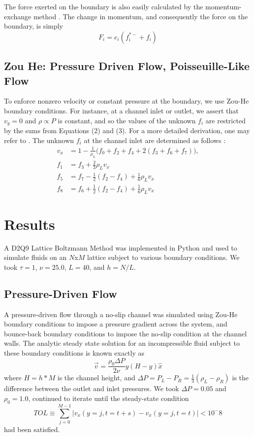 \documentclass[a4paper]{article}
\begin{document}
The force exerted on the boundary is also easily calculated by the momentum-exchange method \cite{momentumexchange} \cite{forcedcurved}. The change in momentum, and consequently the force on the boundary, is simply
\begin{equation}
    F_i = e_i(f_i^{*-} + f_i) 
\end{equation}

\subsection{Zou He: Pressure Driven Flow, Poisseuille-Like Flow}
To enforce nonzero velocity or constant pressure at the boundary, we use Zou-He boundary conditions. For instance, at a channel inlet or outlet, we assert that $v_y = 0$ and $\rho \propto P$ is constant, and so the values of the unknown $f_i$ are restricted by the sums from Equations (2) and (3). For a more detailed derivation, one may refer to \cite{ZouHe}. \cite{ZouHe} The unknown $f_i$ at the channel inlet are determined as follows \cite{ZouHe}:
\begin{align}
    v_x &= 1 - \frac{1}{\rho_L}\big(f_0 + f_2 + f_4 + 2(f_3 + f_6 + f_7)\big), \nonumber \\
    f_1 &= f_3 + \frac{2}{3}\rho_Lv_x \nonumber\\
    f_5 &= f_7 - \frac{1}{2}(f_2 - f_4) + \frac{1}{6}\rho_Lv_x \nonumber\\
    f_8 &= f_6 + \frac{1}{2}(f_2 - f_4) + \frac{1}{6}\rho_Lv_x
\end{align}

\section{Results}
A D2Q9 Lattice Boltzmann Method was implemented in Python and used to simulate fluids on an $N$x$M$ lattice subject to various boundary conditions. We took $\tau=1$, $\nu = 25.0$, $L=40$, and $h=N/L$.

\subsection{Pressure-Driven Flow}
A pressure-driven flow through a no-slip channel was simulated using Zou-He boundary conditions to impose a pressure gradient across the system, and bounce-back boundary conditions to impose the no-slip condition at the channel walls. The analytic steady state solution for an incompressible fluid subject to these boundary conditions is known exactly as 
\begin{equation}
    \vec{v} = \frac{\rho_0\Delta P}{2\nu}y(H-y)\hat{x} 
\end{equation}
where $H = h*M$ is the channel height, and $\Delta P = P_L - P_R = \frac{1}{3}(\rho_L - \rho_R)$ is the difference between the outlet and inlet pressures. We took $\Delta P = 0.05$ and $\rho_0 = 1.0$, continued to iterate until the steady-state condition
\begin{equation}
    TOL \equiv \sum_{j=0}^{M-1} |v_x(y=j, t=t+s) - v_x(y=j, t=t)| < 10^-8
\end{equation}
had been satisfied. 
\end{document}
